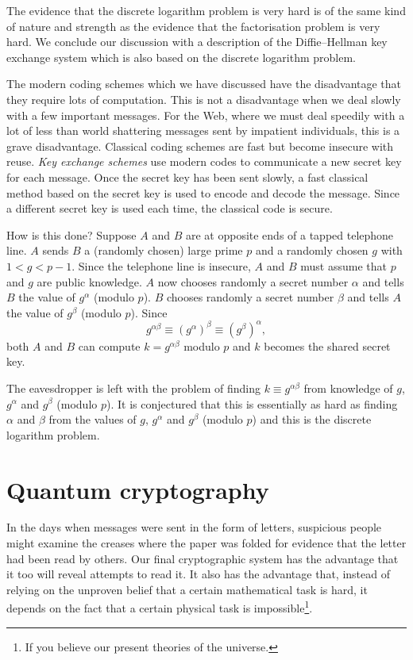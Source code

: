 \documentclass[12pt,a4paper]{article}
\theoremstyle{plain}
\theoremstyle{definition}
\begin{document}
    The evidence that the discrete logarithm problem is very
    hard is of the same kind of nature and strength
    as the evidence that the factorisation problem
    is very hard. We conclude our discussion with
    a description of the Diffie--Hellman key exchange
    system which is also based on the discrete logarithm problem.

    The modern coding schemes which we have discussed
    have the disadvantage that they require lots of computation.
    This is not a disadvantage when we deal slowly
    with a few important messages. For the Web, where
    we must deal speedily with a lot of less than
    world shattering messages sent by impatient
    individuals, this is a grave disadvantage.
    Classical coding schemes are fast but become
    insecure with reuse. \emph{Key exchange schemes}
    use modern codes to communicate a new
    secret key for each message. Once the secret
    key has been sent slowly, a fast classical
    method based on the secret key is used to
    encode and decode the message. Since a different
    secret key is used each time, the classical code
    is secure.

    How is this done? Suppose $A$ and $B$ are at opposite
    ends of a tapped telephone line. $A$ sends $B$
    a (randomly chosen) large prime $p$ and a
    randomly chosen $g$ with $1<g<p-1$. Since the
    telephone line is insecure, $A$ and $B$ must
    assume that $p$ and $g$ are public knowledge.
    $A$ now chooses randomly a secret number $\alpha$ and
    tells $B$ the value of $g^{\alpha}$ (modulo $p$). $B$
    chooses randomly a secret number $\beta$ and
    tells $A$ the value of $g^{\beta}$ (modulo $p$). Since
    \[g^{\alpha\beta}\equiv(g^{\alpha})^{\beta}\equiv(g^{\beta})^{\alpha},\]
    both $A$ and $B$ can compute $k=g^{\alpha\beta}$
    modulo $p$ and $k$ becomes the shared secret key.

    The eavesdropper is left with the problem of
    finding $k\equiv g^{\alpha\beta}$ from knowledge
    of $g$, $g^{\alpha}$ and $g^{\beta}$ (modulo $p$).
    It is conjectured that this is essentially
    as hard as finding $\alpha$ and $\beta$
    from the values of $g$, $g^{\alpha}$ and $g^{\beta}$ (modulo $p$)
    and this is the discrete logarithm problem.
    \section{Quantum cryptography}
    In the days
    when messages were sent in the form of letters,
    suspicious people might examine the creases
    where the paper was folded for evidence that
    the letter had been read by others. Our final
    cryptographic system has the advantage that it
    too will reveal attempts to read it. It also
    has the advantage that, instead of relying
    on the unproven belief that a certain mathematical
    task is hard, it depends on the fact that a certain
    physical task is impossible\footnote{If you
    believe our present theories of the universe.}.
\end{document}
